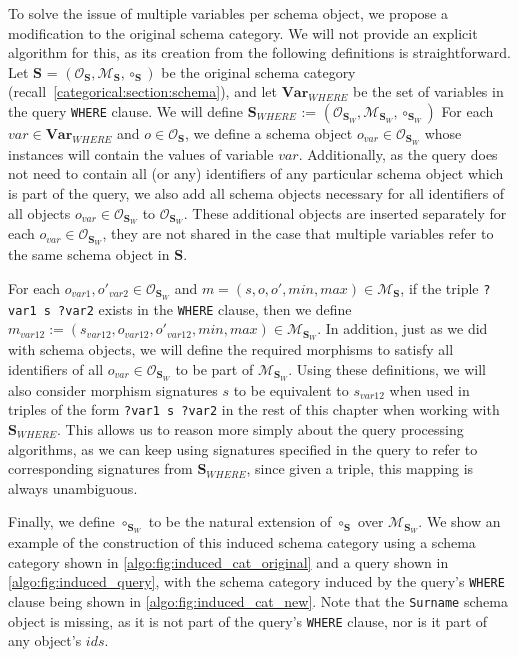 To solve the issue of multiple variables per schema object, we propose a modification to the original schema category.
We will not provide an explicit algorithm for this, as its creation from the following definitions is straightforward.
Let $\mathbf{S}$ = $(\mathcal{O}_\mathbf{S}, \mathcal{M}_\mathbf{S}, \circ_\mathbf{S})$ be the original schema category (recall~\cref{categorical:section:schema}), and let $\mathbf{Var}_{WHERE}$ be the set of variables in the query \texttt{WHERE} clause.
We will define $\mathbf{S}_{WHERE}$ := $(\mathcal{O}_{\mathbf{S}_W}, \mathcal{M}_{\mathbf{S}_W}, \circ_{\mathbf{S}_W})$
For each $var \in \mathbf{Var}_{WHERE}$ and $o \in \mathcal{O}_\mathbf{S}$, we define a schema object $o_{var} \in \mathcal{O}_{\mathbf{S}_W}$ whose instances will contain the values of variable $var$.
Additionally, as the query does not need to contain all (or any) identifiers of any particular schema object which is part of the query, we also add all schema objects necessary for all identifiers of all objects $o_{var} \in \mathcal{O}_{\mathbf{S}_W}$ to $\mathcal{O}_{\mathbf{S}_W}$.
These additional objects are inserted separately for each $o_{var} \in \mathcal{O}_{\mathbf{S}_W}$, they are not shared in the case that multiple variables refer to the same schema object in $\mathbf{S}$.

For each $o_{var1}, o'_{var2} \in \mathcal{O}_{\mathbf{S}_W}$ and $m = (s, o, o', min, max) \in \mathcal{M}_\mathbf{S}$, if the triple \texttt{?var1 s ?var2} exists in the \texttt{WHERE} clause, then we define\\ $m_{var12} := (s_{var12}, o_{var12}, o'_{var12}, min, max) \in \mathcal{M}_{\mathbf{S}_W}$.
In addition, just as we did with schema objects, we will define the required morphisms to satisfy all identifiers of all $o_{var} \in \mathcal{O}_{\mathbf{S}_W}$ to be part of $\mathcal{M}_{\mathbf{S}_W}$.
Using these definitions, we will also consider morphism signatures $s$ to be equivalent to $s_{var12}$ when used in triples of the form \texttt{?var1 s ?var2} in the rest of this chapter when working with $\mathbf{S}_{WHERE}$.
This allows us to reason more simply about the query processing algorithms, as we can keep using signatures specified in the query to refer to corresponding signatures from $\mathbf{S}_{WHERE}$, since given a triple, this mapping is always unambiguous.

Finally, we define $\circ_{\mathbf{S}_W}$ to be the natural extension of $\circ_\mathbf{S}$ over $\mathcal{M}_{\mathbf{S}_W}$.
We show an example of the construction of this induced schema category using a schema category shown in \cref{algo:fig:induced_cat_original} and a query shown in \cref{algo:fig:induced_query}, with the schema category induced by the query's \texttt{WHERE} clause being shown in \cref{algo:fig:induced_cat_new}.
Note that the \texttt{Surname} schema object is missing, as it is not part of the query's \texttt{WHERE} clause, nor is it part of any object's $ids$.

